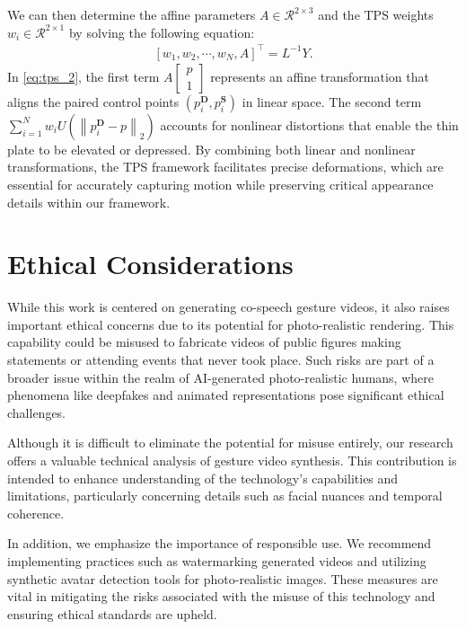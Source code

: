 We can then determine the affine parameters \(A \in \mathcal{R}^{2 \times 3}\) and the TPS weights \(w_{i} \in \mathcal{R}^{2 \times 1}\) by solving the following equation:
\begin{equation}
\begin{aligned}
\left[w_1, w_2, \cdots, w_N, A\right]^{\top} = L^{-1}Y.
\end{aligned}
\end{equation}
In \cref{eq:tps_2}, the first term \(A\left[\begin{array}{l} 
p \\ 1 \end{array}\right]\) represents an affine transformation that aligns the paired control points \((p^\mathbf{D}_i, p^\mathbf{S}_i)\) in linear space. The second term \(\sum_{i=1}^{N} w_{i} U\left(\left\|p^{\mathbf{D}}_{i}-p\right\|_{2}\right)\) accounts for nonlinear distortions that enable the thin plate to be elevated or depressed. By combining both linear and nonlinear transformations, the TPS framework facilitates precise deformations, which are essential for accurately capturing motion while preserving critical appearance details within our framework.



\section{Ethical Considerations} 
\label{sec:ethics}

While this work is centered on generating co-speech gesture videos, it also raises important ethical concerns due to its potential for photo-realistic rendering. This capability could be misused to fabricate videos of public figures making statements or attending events that never took place. Such risks are part of a broader issue within the realm of AI-generated photo-realistic humans, where phenomena like deepfakes and animated representations pose significant ethical challenges.

Although it is difficult to eliminate the potential for misuse entirely, our research offers a valuable technical analysis of gesture video synthesis. This contribution is intended to enhance understanding of the technology's capabilities and limitations, particularly concerning details such as facial nuances and temporal coherence.

In addition, we emphasize the importance of responsible use. We recommend implementing practices such as watermarking generated videos and utilizing synthetic avatar detection tools for photo-realistic images. These measures are vital in mitigating the risks associated with the misuse of this technology and ensuring ethical standards are upheld.





